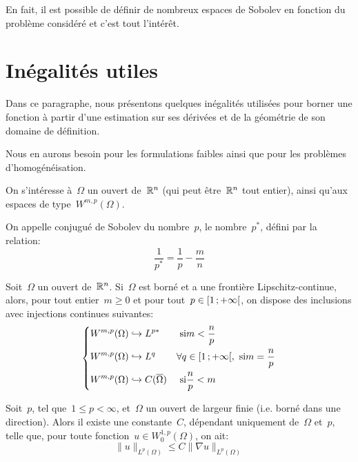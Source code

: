 \medskip
En fait, il est possible de définir de nombreux espaces de Sobolev en fonction du problème considéré et c'est tout l'intérêt.

\medskip
\section{Inégalités utiles}
Dans ce paragraphe, nous présentons quelques inégalités utilisées pour borner une fonction à partir d'une estimation sur
ses dérivées et de la géométrie de son domaine de définition.

Nous en aurons besoin pour les formulations faibles ainsi que pour les problèmes d'homogénéisation.
\medskip
\begin{definition}
On s'intéresse à~$\Omega$ un ouvert de~$\mathbb R^n$ (qui peut être~$\mathbb R^n$ tout entier), ainsi qu'aux
espaces de type~$W^{m,p}(\Omega)$.

On appelle conjugué de Sobolev du nombre~$p$, le nombre~$p^*$, défini par la relation:
\begin{equation}
  \frac{1}{p^*} = \frac{1}{p} - \frac{m}{n}
\end{equation}
\end{definition}
\begin{theoreme}
Soit~$\Omega$ un ouvert de~$\mathbb R^n$. Si~$\Omega$ est borné et a une frontière Lipschitz-continue,
alors, pour tout entier~$m\ge 0$ et pour tout~$p\in\mathopen{[}1\,;+\infty\mathclose{[}$, on dispose des inclusions avec injections continues
suivantes:
\begin{equation}
\left\{\begin{aligned}
&W^{m,p}(\Omega) \hookrightarrow L^{p*} && \text{ si} m<\frac{n}p\\
&W^{m,p}(\Omega) \hookrightarrow L^q && \forall q\in\mathopen{[}1\,;+\infty\mathclose{[}, \text{ si} m=\frac{n}p\\
&W^{m,p}(\Omega) \hookrightarrow C(\overline{\Omega}) && \text{ si} \frac{n}p<m
\end{aligned}\right.
\end{equation}
\end{theoreme}


\medskip

\begin{theoreme}
Soit~$p$, tel que~$1 \le p <\infty$, et~$\Omega$ un ouvert de largeur finie
(i.e. borné dans une direction).
Alors il existe une constante~$C$, dépendant uniquement de~$\Omega$ et~$p$, telle que,
pour toute fonction~$u\in W_0^{1,p}(\Omega)$, on ait:
\begin{equation}
\|u\|_{L^p(\Omega)} \le C \|\nabla u\|_{L^p(\Omega)}
\end{equation}
\end{theoreme}


